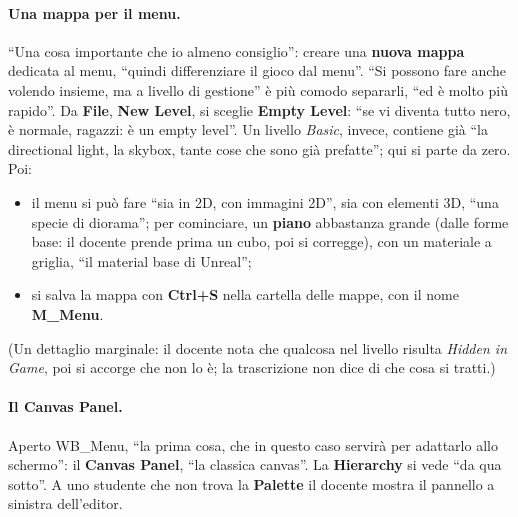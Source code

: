 \paragraph{Una mappa per il menu.} ``Una cosa importante che io almeno consiglio'': creare
una \textbf{nuova mappa} dedicata al menu, ``quindi differenziare il gioco dal menu''. ``Si
possono fare anche volendo insieme, ma a livello di gestione'' è più comodo separarli, ``ed
è molto più rapido''. Da \textbf{File}, \textbf{New Level}, si sceglie \textbf{Empty
Level}: ``se vi diventa tutto nero, è normale, ragazzi: è un empty level''. Un livello
\emph{Basic}, invece, contiene già ``la directional light, la skybox, tante cose che sono
già prefatte''; qui si parte da zero. Poi:
\begin{itemize}
  \item il menu si può fare ``sia in 2D, con immagini 2D'', sia con elementi 3D, ``una
        specie di diorama''; per cominciare, un \textbf{piano} abbastanza grande (dalle
        forme base: il docente prende prima un cubo, poi si corregge), con un materiale a
        griglia, ``il material base di Unreal'';
  \item si salva la mappa con \textbf{Ctrl+S} nella cartella delle mappe, con il nome
        \textbf{M\_Menu}.
\end{itemize}
(Un dettaglio marginale: il docente nota che qualcosa nel livello risulta \emph{Hidden in
Game}, poi si accorge che non lo è; la trascrizione non dice di che cosa si tratti.)

\paragraph{Il Canvas Panel.} Aperto WB\_Menu, ``la prima cosa, che in questo caso servirà
per adattarlo allo schermo'': il \textbf{Canvas Panel}, ``la classica canvas''. La
\textbf{Hierarchy} si vede ``da qua sotto''. A uno studente che non trova la
\textbf{Palette} il docente mostra il pannello a sinistra dell'editor.

